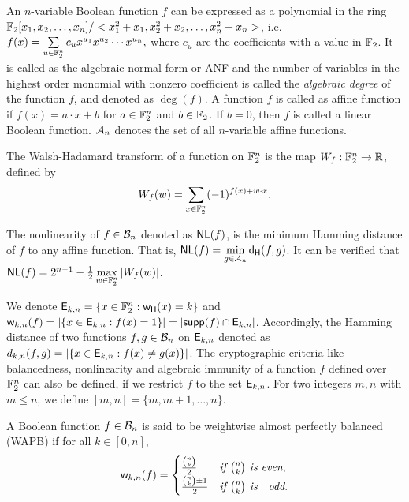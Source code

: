 \documentclass{llncs}
\begin{document}
An $n$-variable Boolean function $f$ can be expressed as a polynomial in the ring $\mathbb{F}_2[x_1,x_2,\ldots,x_n]/<x_1^2+x_1,x_2^2+x_2,\ldots,x_n^2+x_n>$, i.e. 
$f(x) = \sum\limits_{u \in \mathbb{F}_2^n}c_u x^{u_1}x^{u_2}\cdots x^{u_n},$
where $c_u$ are the coefficients with a value in $\mathbb{F}_2$.
It is called as the algebraic normal form or ANF and the number of variables in the highest order monomial with nonzero coefficient is called the \textit{algebraic degree} of the function $f$, and denoted as $\deg(f)$.
A function $f$ is called as affine function if $f(x)= a\cdot x + b$ for $a \in \mathbb{F}_2^n$ and $b \in \mathbb{F}_2$. If $b=0$, then $f$ is called a linear Boolean function. $\mathcal{A}_n$ denotes the set of all $n$-variable affine functions. 

\begin{definition}\label{def:Walsh}
The Walsh-Hadamard transform of a function on $\mathbb{F}_2^n$ is the map $W_f : \mathbb{F}_2^n \to \mathbb{R}$, defined by \[W_{f}(w)= \sum_{x \in \mathbb{F}_2^n} (-1)^{f(x)+ w \cdot x}.\]
\end{definition}

\begin{definition}[Nonlinearity]\label{def:Nonlinearity}
The nonlinearity of $f \in \mathcal{B}_n$ denoted as $\mathsf{NL}(f)$, is the minimum Hamming distance of $f$ to any affine function. That is, $\mathsf{NL}(f) = \min\limits_{g \in \mathcal{A}_n} \mathsf{d_H}(f,g)$.
It can be verified that $\mathsf{NL}(f) = 2^{n-1} - \frac{1}{2}\max\limits_{w \in \mathbb{F}_2^n} |W_{f}(w)|$.
\end{definition}

We denote $\mathsf{E}_{k,n} = \{x \in \mathbb{F}_2^n : \mathsf{w_H}(x)=k\}$ and $\mathsf{w}_{k,n}(f) = |\{x \in \mathsf{E}_{k,n} : f(x) = 1 \}| = |\mathsf{supp}(f) \cap \mathsf{E}_{k,n}|$. Accordingly, the Hamming distance of two functions $f, g \in \mathcal{B}_n$ on $\mathsf{E}_{k,n}$ denoted as $d_{k,n}(f,g) = |\{x \in \mathsf{E}_{k,n} : f(x) \neq g(x)\}|$. The cryptographic criteria like balancedness, nonlinearity and algebraic immunity of a function $f$ defined over $\mathbb{F}_2^n$ can also be defined, if we restrict $f$ to the set $\mathsf{E}_{k,n}$. For two integers $m, n$ with $m \leq n$, we define $[m,n] = \{m, m+1, \ldots, n\}$.

\begin{definition}\label{def:WAPB}
A Boolean function $f \in \mathcal{B}_n$ is said to be weightwise almost perfectly balanced (WAPB) if for all $k \in [0,n]$, \[\mathsf{w}_{k,n}(f)=
\begin{cases}
\frac{{n\choose k}}{2} & \textit{if } {n \choose k} \textit{ is even},\\
\frac{{n \choose k}\pm 1}{2} & \textit{if } {n \choose k} \textit{ is \; odd}.
\end{cases} \]
\end{definition}
\end{document}
